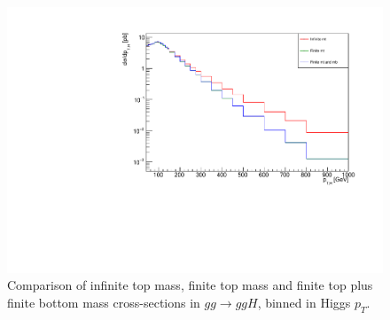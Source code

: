 \begin{figure}[H]
\centering
\includegraphics[scale=0.7]{Images/ptH_gg.pdf}
\caption{Comparison of infinite top mass, finite top mass and finite top plus finite bottom mass cross-sections in $gg \to ggH$, binned in Higgs $p_T$. }
\label{fig:pth_gg}
\end{figure}

